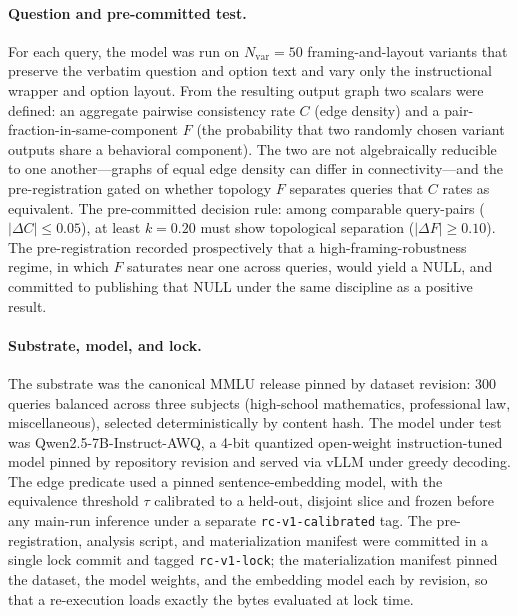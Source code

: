 \documentclass[11pt]{article}
\begin{document}
\paragraph{Question and pre-committed test.}
For each query, the model was run on $N_{\mathrm{var}} = 50$
framing-and-layout variants that preserve the verbatim question and
option text and vary only the instructional wrapper and option
layout. From the resulting output graph two scalars were defined: an
aggregate pairwise consistency rate $C$ (edge density) and a
pair-fraction-in-same-component $F$ (the probability that two
randomly chosen variant outputs share a behavioral component). The
two are not algebraically reducible to one another---graphs of equal
edge density can differ in connectivity---and the pre-registration
gated on whether topology $F$ separates queries that $C$ rates as
equivalent. The pre-committed decision rule: among comparable
query-pairs ($|\Delta C| \leq 0.05$), at least $k = 0.20$ must show
topological separation ($|\Delta F| \geq 0.10$). The pre-registration
recorded prospectively that a high-framing-robustness regime, in
which $F$ saturates near one across queries, would yield a NULL, and
committed to publishing that NULL under the same discipline as a
positive result.

\paragraph{Substrate, model, and lock.}
The substrate was the canonical MMLU release pinned by dataset
revision: 300 queries balanced across three subjects
(high-school mathematics, professional law, miscellaneous),
selected deterministically by content hash. The model under test was
Qwen2.5-7B-Instruct-AWQ, a 4-bit quantized open-weight
instruction-tuned model pinned by repository revision and served via
vLLM under greedy decoding. The edge predicate used a pinned
sentence-embedding model, with the equivalence threshold $\tau$
calibrated to a held-out, disjoint slice and frozen before any
main-run inference under a separate \texttt{rc-v1-calibrated} tag.
The pre-registration, analysis script, and materialization manifest
were committed in a single lock commit and tagged
\texttt{rc-v1-lock}; the materialization manifest pinned the dataset,
the model weights, and the embedding model each by revision, so that
a re-execution loads exactly the bytes evaluated at lock time.
\end{document}
